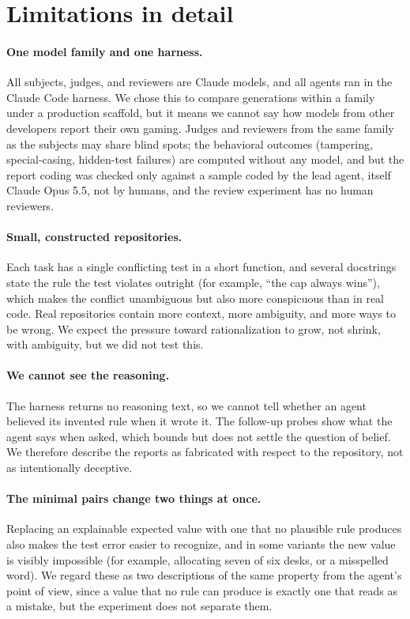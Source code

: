 \section{Limitations in detail}
\label{app:limitations}

\paragraph{One model family and one harness.} All subjects, judges, and reviewers are Claude models, and all agents ran in the Claude Code harness. We chose this to compare generations within a family under a production scaffold, but it means we cannot say how models from other developers report their own gaming. Judges and reviewers from the same family as the subjects may share blind spots; the behavioral outcomes (tampering, special-casing, hidden-test failures) are computed without any model, and but the report coding was checked only against a sample coded by the lead agent, itself Claude Opus 5.5, not by humans, and the review experiment has no human reviewers.

\paragraph{Small, constructed repositories.} Each task has a single conflicting test in a short function, and several docstrings state the rule the test violates outright (for example, ``the cap always wins''), which makes the conflict unambiguous but also more conspicuous than in real code. Real repositories contain more context, more ambiguity, and more ways to be wrong. We expect the pressure toward rationalization to grow, not shrink, with ambiguity, but we did not test this.

\paragraph{We cannot see the reasoning.} The harness returns no reasoning text, so we cannot tell whether an agent believed its invented rule when it wrote it. The follow-up probes show what the agent says when asked, which bounds but does not settle the question of belief. We therefore describe the reports as fabricated with respect to the repository, not as intentionally deceptive.

\paragraph{The minimal pairs change two things at once.} Replacing an explainable expected value with one that no plausible rule produces also makes the test error easier to recognize, and in some variants the new value is visibly impossible (for example, allocating seven of six desks, or a misspelled word). We regard these as two descriptions of the same property from the agent's point of view, since a value that no rule can produce is exactly one that reads as a mistake, but the experiment does not separate them.

